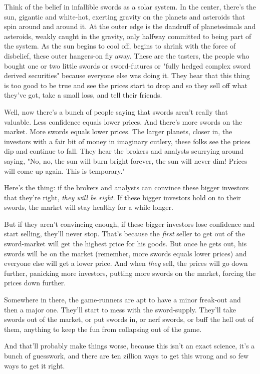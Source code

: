 Think of the belief in infallible swords as a solar system. In the
center, there's the sun, gigantic and white-hot, exerting gravity
on the planets and asteroids that spin around and around it. At the
outer edge is the dandruff of planetesimals and asteroids, weakly
caught in the gravity, only halfway committed to being part of the
system. As the sun begins to cool off, begins to shrink with the
force of disbelief, these outer hangers-on fly away. These are the
tasters, the people who bought one or two little swords or
sword-futures or "fully hedged complex sword derived securities"
because everyone else was doing it. They hear that this thing is
too good to be true and see the prices start to drop and so they
sell off what they've got, take a small loss, and tell their
friends.

Well, now there's a bunch of people saying that swords aren't
really that valuable. Less confidence equals lower prices. And
there's more swords on the market. More swords equals lower prices.
The larger planets, closer in, the investors with a fair bit of
money in imaginary cutlery, these folks see the prices dip and
continue to fall. They hear the brokers and analysts scurrying
around saying, "No, no, the sun will burn bright forever, the sun
will never dim! Prices will come up again. This is temporary."

Here's the thing: if the brokers and analysts can convince these
bigger investors that they're right, \emph{they will be right}. If
these bigger investors hold on to their swords, the market will
stay healthy for a while longer.

But if they aren't convincing enough, if these bigger investors
lose confidence and start selling, they'll never stop. That's
because the \emph{first} seller to get out of the sword-market will
get the highest price for his goods. But once he gets out, his
swords will be on the market (remember, more swords equals lower
prices) and everyone else will get a lower price. And when
\emph{they} sell, the prices will go down further, panicking more
investors, putting more swords on the market, forcing the prices
down further.

Somewhere in there, the game-runners are apt to have a minor
freak-out and then a major one. They'll start to mess with the
sword-supply. They'll take swords out of the market, or put swords
in, or nerf swords, or buff the hell out of them, anything to keep
the fun from collapsing out of the game.

And that'll probably make things worse, because this isn't an exact
science, it's a bunch of guesswork, and there are ten zillion ways
to get this wrong and so few ways to get it right.

